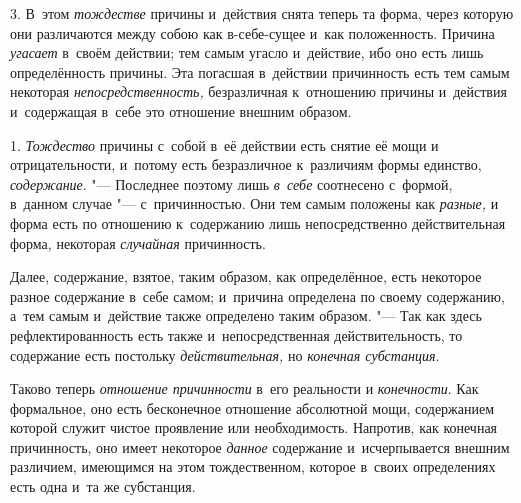 3. В~этом {\em тождестве} причины и~действия снята теперь та форма, через
которую они различаются между собою как в-себе-сущее и~как положенность.
Причина {\em угасает} в~своём действии; тем самым угасло и~действие, ибо оно
есть лишь определённость причины. Эта погасшая в~действии причинность есть тем
самым некоторая {\em непосредственность,} безразличная к~отношению причины
и~действия и~содержащая в~себе это отношение внешним образом.


1. {\em Тождество} причины с~собой в~её действии есть снятие её мощи и
отрицательности, и~потому есть безразличное к~различиям формы единство,
{\em содержание}. "--- Последнее поэтому лишь {\em в~себе} соотнесено с~формой,
в~данном случае "--- с~причинностью. Они тем самым положены как {\em разные,} и
форма есть по отношению к~содержанию лишь непосредственно действительная форма,
некоторая {\em случайная} причинность.

Далее, содержание, взятое, таким образом, как определённое, есть некоторое
разное содержание в~себе самом; и~причина определена по своему содержанию,
а~тем самым и~действие также определено таким образом. "--- Так как здесь
рефлектированность есть также и~непосредственная действительность, то
содержание есть постольку {\em действительная,} но {\em конечная субстанция}.

Таково теперь {\em отношение причинности} в~его реальности и {\em конечности}.
Как формальное, оно есть бесконечное отношение абсолютной мощи, содержанием
которой служит чистое проявление или необходимость. Напротив, как конечная
причинность, оно имеет некоторое {\em данное} содержание и~исчерпывается
внешним различием, имеющимся на этом тождественном, которое в~своих
определениях есть одна и~та же субстанция.

